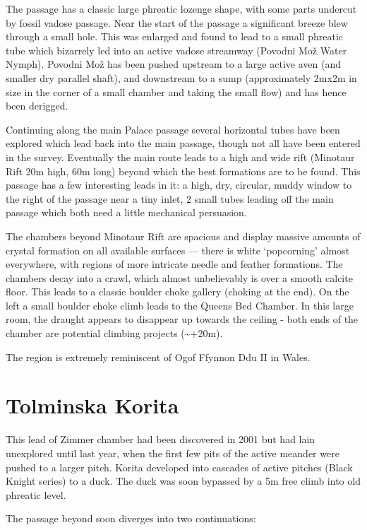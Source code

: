 The passage has a classic large phreatic lozenge shape, with some parts
undercut by fossil vadose passage. Near the start of the passage a
significant breeze blew through a small hole. This was enlarged and
found to lead to a small phreatic tube which bizarrely led into an
active vadose streamway (Povodni Mo\v{z} \textemdash{} Water Nymph).
Povodni Mo\v{z} has been pushed upstream to a large active aven (and
smaller dry parallel shaft), and downstream to a sump (approximately
2mx2m in size in the corner of a small chamber and taking the small
flow) and has hence been derigged.

Continuing along the main Palace passage several horizontal tubes have
been explored which lead back into the main passage, though not all have
been entered in the survey. Eventually the main route leads to a high
and wide rift (Minotaur Rift \textemdash{} 20m high, 60m long) beyond
which the best formations are to be found. This passage has a few
interesting leads in it: a high, dry, circular, muddy window to the
right of the passage near a tiny inlet, 2 small tubes leading off the
main passage which both need a little mechanical persuasion.

The chambers beyond Minotaur Rift are spacious and display massive
amounts of crystal formation on all available surfaces --- there is
white `popcorning' almost everywhere, with regions of more intricate
needle and feather formations. The chambers decay into a crawl, which
almost unbelievably is over a smooth calcite floor. This leads to a
classic boulder choke gallery (choking at the end). On the left a small
boulder choke climb leads to the Queens Bed Chamber. In this large room,
the draught appears to disappear up towards the ceiling - both ends of
the chamber are potential climbing projects (\textasciitilde{}+20m).

The region is extremely reminiscent of Ogof Ffynnon Ddu II in Wales.

\section{Tolminska Korita}

This lead of Zimmer chamber had been discovered in 2001 but had lain
unexplored until last year, when the first few pits of the active
meander were pushed to a larger pitch. Korita developed into cascades of
active pitches (Black Knight series) to a duck. The duck was soon
bypassed by a 5m free climb into old phreatic level.

The passage beyond soon diverges into two continuations:

